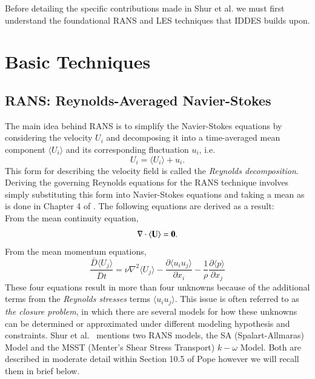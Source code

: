\documentclass[12pt,letterpaper]{article}
\begin{document}
Before detailing the specific contributions made in Shur et al. we must first understand the foundational RANS and LES techniques that IDDES builds upon.






\section{Basic Techniques}
\subsection{\textbf{RANS: Reynolds-Averaged Navier-Stokes}} The main idea behind RANS is to simplify the Navier-Stokes equations by considering the velocity $U_i$ and decomposing it into a time-averaged mean component $\langle U_i\rangle$ and its corresponding fluctuation $u_i$, i.e.
\begin{equation}
    U_i = \langle U_i \rangle + u_i.  
\end{equation}
This form for describing the velocity field is called the \emph{Reynolds decomposition}. Deriving the governing Reynolds equations for the RANS technique involves simply substituting this form into Navier-Stokes equations and taking a mean as is done in Chapter 4 of \cite{pope2000}. The following equations are derived as a result: \\
From the mean continuity equation,
\begin{equation}
    \nabla \cdot \langle \bf{U} \rangle = 0.
\end{equation}
From the mean momentum equations, 
\begin{equation}
    \frac{\bar{D}\langle U_j\rangle}{\bar{D}t} = \nu \nabla^2\langle U_j\rangle - \frac{\partial \langle u_iu_j\rangle}{\partial x_i} - \frac{1}{\rho} \frac{\partial \langle p\rangle }{\partial x_j}
\end{equation}
These four equations result in more than four unknowns because of the additional terms from the \emph{Reynolds stresses} terms $\langle u_i u_j \rangle$. This issue is often referred to as \emph{the closure problem}, in which there are several models for how these unknowns can be determined or approximated under different modeling hypothesis and constraints. Shur et al.~\cite{shur2008hybrid} mentions two RANS models, the SA (Spalart-Allmaras) Model and the MSST (Menter's Shear Stress Transport) $k - \omega$ Model. Both are described in moderate detail within Section 10.5 of Pope \cite{pope2000} however we will recall them in brief below. \\
\end{document}
